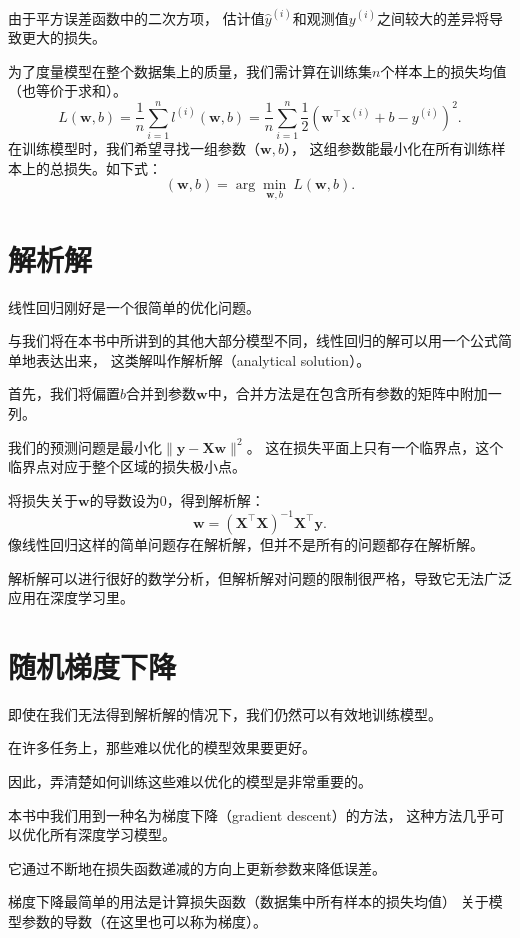 \documentclass[openany,11pt]{book}
\begin{document}
由于平方误差函数中的二次方项，
估计值$\hat{y}^{(i)}$和观测值$y^{(i)}$之间较大的差异将导致更大的损失。

为了度量模型在整个数据集上的质量，我们需计算在训练集$n$个样本上的损失均值（也等价于求和）。
$$L(\mathbf{w}, b) =\frac{1}{n}\sum_{i=1}^n l^{(i)}(\mathbf{w}, b) =\frac{1}{n} \sum_{i=1}^n \frac{1}{2}\left(\mathbf{w}^\top \mathbf{x}^{(i)} + b - y^{(i)}\right)^2.$$
在训练模型时，我们希望寻找一组参数（$\mathbf{w}, b$），
这组参数能最小化在所有训练样本上的总损失。如下式：
$$(\mathbf{w}, b)= \arg\min_{\mathbf{w}, b}\  L(\mathbf{w}, b).$$



\section{解析解}

线性回归刚好是一个很简单的优化问题。

与我们将在本书中所讲到的其他大部分模型不同，线性回归的解可以用一个公式简单地表达出来，
这类解叫作解析解（analytical solution）。

首先，我们将偏置$b$合并到参数$\mathbf{w}$中，合并方法是在包含所有参数的矩阵中附加一列。

我们的预测问题是最小化$\|\mathbf{y} - \mathbf{X}\mathbf{w}\|^2$。
这在损失平面上只有一个临界点，这个临界点对应于整个区域的损失极小点。

将损失关于$\mathbf{w}$的导数设为0，得到解析解：
$$\mathbf{w}= (\mathbf X^\top \mathbf X)^{-1}\mathbf X^\top \mathbf{y}.$$
像线性回归这样的简单问题存在解析解，但并不是所有的问题都存在解析解。

解析解可以进行很好的数学分析，但解析解对问题的限制很严格，导致它无法广泛应用在深度学习里。



\section{随机梯度下降}

即使在我们无法得到解析解的情况下，我们仍然可以有效地训练模型。

在许多任务上，那些难以优化的模型效果要更好。

因此，弄清楚如何训练这些难以优化的模型是非常重要的。

本书中我们用到一种名为梯度下降（gradient descent）的方法，
这种方法几乎可以优化所有深度学习模型。

它通过不断地在损失函数递减的方向上更新参数来降低误差。

梯度下降最简单的用法是计算损失函数（数据集中所有样本的损失均值）
关于模型参数的导数（在这里也可以称为梯度）。
\end{document}
